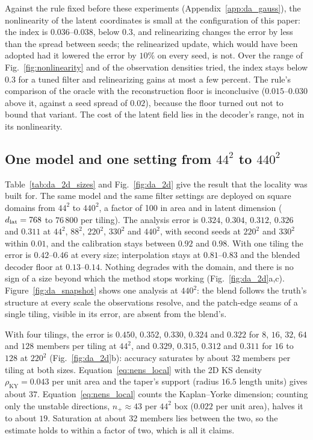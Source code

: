 Against the rule fixed before these experiments
(Appendix~\ref{app:da_gauss}), the nonlinearity of the latent
coordinates is small at the configuration of this paper: the index is
$0.036$--$0.038$, below $0.3$, and relinearizing changes the error by less
than the spread between seeds; the relinearized update, which would have
been adopted had it lowered the error by $10\%$ on every seed, is not.
Over the range of Fig.~\ref{fig:nonlinearity} and of the observation densities tried, the index stays
below $0.3$ for a tuned filter and relinearizing gains at most a few percent.
The rule's comparison of the oracle with the reconstruction floor is
inconclusive ($0.015$--$0.030$ above it, against a seed spread of $0.02$),
because the floor turned out not to bound that variant. The cost of the
latent field lies in the decoder's range, not in its nonlinearity.

\subsection{One model and one setting from \texorpdfstring{$44^2$ to $440^2$}{44x44 to 440x440}}
\label{sec:da_2d}

Table~\ref{tab:da_2d_sizes} and Fig.~\ref{fig:da_2d} give the result
that the locality was built for. The same model and the same filter
settings are deployed on square domains from $44^2$ to $440^2$, a factor of
100 in area and in latent dimension ($d_{\mathrm{lat}} = 768$ to $76\,800$ per tiling).
The analysis error is $0.324$, $0.304$, $0.312$, $0.326$ and $0.311$ at $44^2$, $88^2$,
$220^2$, $330^2$ and $440^2$, with second seeds at $220^2$ and $330^2$ within $0.01$, and
the calibration stays between $0.92$ and $0.98$. With one tiling the error
is $0.42$--$0.46$ at every size; interpolation stays at $0.81$--$0.83$ and the
blended decoder floor at $0.13$--$0.14$. Nothing degrades with the domain,
and there is no sign of a size beyond which the method stops working
(Fig.~\ref{fig:da_2d}a,c). Figure~\ref{fig:da_snapshot} shows one analysis at $440^2$: the
blend follows the truth's structure at every scale the observations
resolve, and the patch-edge seams of a single tiling, visible in its error,
are absent from the blend's.

 With four tilings, the
error is $0.450$, $0.352$, $0.330$, $0.324$ and $0.322$ for $8$, $16$, $32$, $64$ and $128$
members per tiling at $44^2$, and $0.329$, $0.315$, $0.312$ and $0.311$ for $16$ to $128$ at
$220^2$ (Fig.~\ref{fig:da_2d}b): accuracy saturates by about 32 members per
tiling at both sizes. Equation~\eqref{eq:nens_local} with the 2D KS
density $\rho_{\mathrm{KY}}=0.043$ per unit area and the taper's support (radius $16.5$
length units) gives about $37$. Equation~\eqref{eq:nens_local} counts the Kaplan--Yorke dimension;
counting only the unstable directions, $n_+\approx43$ per $44^2$ box ($0.022$ per unit area), halves it to
about $19$. Saturation at about 32 members lies between the two, so the estimate holds to within a
factor of two, which is all it claims.

